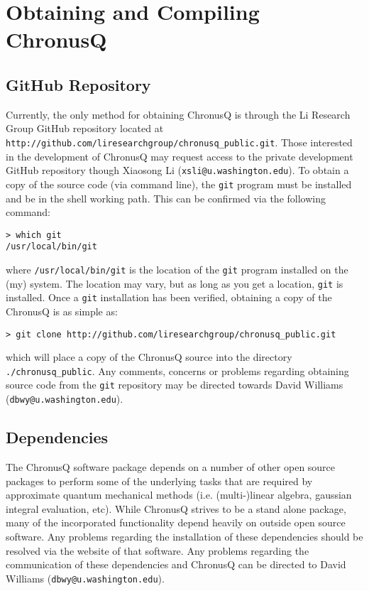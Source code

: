 \documentclass[12pt]{article}
\makeatletter
\newcommand{\ChronusQGitHubPUBLIC}{\texttt{http://github.com/liresearchgroup/chronusq\_public.git}}
\newcommand{\XiaosongContact}{Xiaosong Li (\texttt{xsli@u.washington.edu})}
\newcommand{\DBWYContact}{David Williams (\texttt{dbwy@u.washington.edu})}
\makeatother
\begin{document}
  \section{Obtaining and Compiling ChronusQ} \label{sec:ObtainAndCompile}
    \subsection{GitHub Repository} \label{subsec:ChronusQGitHub}

    Currently, the only method for obtaining ChronusQ is through the Li Research
    Group GitHub repository located at \ChronusQGitHubPUBLIC. Those interested in
    the development of ChronusQ may request access to the private development GitHub
    repository though \XiaosongContact. To obtain a copy of the source code (via 
    command line), the \texttt{git} program must be installed and be in the shell 
    working path. This can be confirmed via the following command:

    \begin{lstlisting}
> which git
/usr/local/bin/git
    \end{lstlisting}

    \noindent where \texttt{/usr/local/bin/git} is the location of the \texttt{git} 
    program installed on the (my) system. The location may vary, but as long as 
    you get a location, \texttt{git} is installed. Once a \texttt{git} 
    installation has been verified, obtaining a copy of the ChronusQ is as 
    simple as:

    \begin{lstlisting}
> git clone http://github.com/liresearchgroup/chronusq_public.git
    \end{lstlisting}
    
    \noindent which will place a copy of the ChronusQ source into the directory 
    \texttt{./chronusq\_public}. Any comments, concerns or problems regarding 
    obtaining source code from the \texttt{git} repository may be directed 
    towards \DBWYContact. 

    \subsection{Dependencies} \label{subsec:ChronusQDeps}

    The ChronusQ software package depends on a number of other open source packages
    to perform some of the underlying tasks that are required by approximate
    quantum mechanical methods (i.e. (multi-)linear algebra, gaussian integral 
    evaluation, etc). While ChronusQ strives to be a stand alone package, many
    of the incorporated functionality depend heavily on outside open source 
    software. Any problems regarding the installation of these dependencies should
    be resolved via the website of that software. Any problems regarding the
    communication of these dependencies and ChronusQ can be directed to
    \DBWYContact.
    
\end{document}

